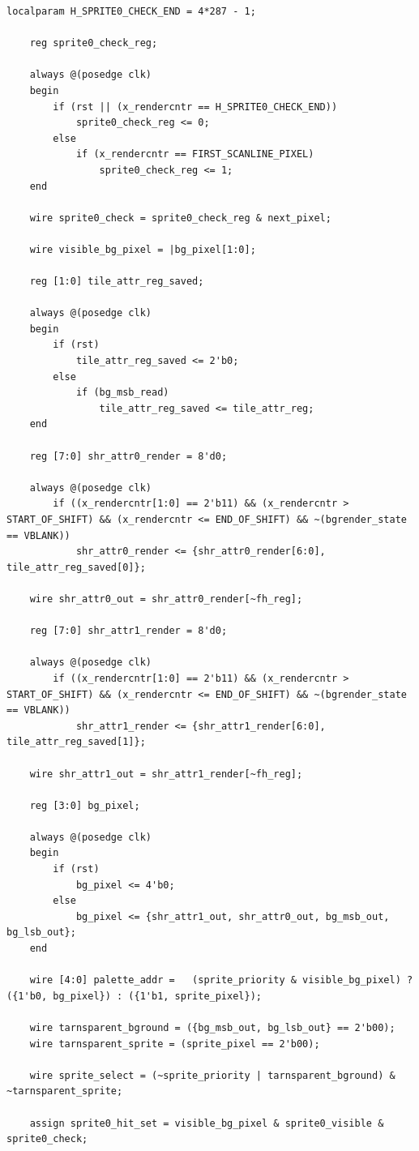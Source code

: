 	\begin{lstlisting}[style=prettyverilog]
	localparam H_SPRITE0_CHECK_END = 4*287 - 1;
	
	reg sprite0_check_reg;
	
	always @(posedge clk)
	begin
		if (rst || (x_rendercntr == H_SPRITE0_CHECK_END))
			sprite0_check_reg <= 0;
		else
			if (x_rendercntr == FIRST_SCANLINE_PIXEL)
				sprite0_check_reg <= 1;
	end
	
	wire sprite0_check = sprite0_check_reg & next_pixel;
	
	wire visible_bg_pixel = |bg_pixel[1:0];
	
	reg [1:0] tile_attr_reg_saved;
	
	always @(posedge clk) 
	begin
		if (rst)
			tile_attr_reg_saved <= 2'b0;
		else
			if (bg_msb_read)
				tile_attr_reg_saved <= tile_attr_reg;
	end
	
	reg [7:0] shr_attr0_render = 8'd0; 
	
	always @(posedge clk) 
		if ((x_rendercntr[1:0] == 2'b11) && (x_rendercntr > START_OF_SHIFT) && (x_rendercntr <= END_OF_SHIFT) && ~(bgrender_state == VBLANK))
			shr_attr0_render <= {shr_attr0_render[6:0], tile_attr_reg_saved[0]};
	
	wire shr_attr0_out = shr_attr0_render[~fh_reg];
	
	reg [7:0] shr_attr1_render = 8'd0; 
	
	always @(posedge clk) 
		if ((x_rendercntr[1:0] == 2'b11) && (x_rendercntr > START_OF_SHIFT) && (x_rendercntr <= END_OF_SHIFT) && ~(bgrender_state == VBLANK))
			shr_attr1_render <= {shr_attr1_render[6:0], tile_attr_reg_saved[1]};
	
	wire shr_attr1_out = shr_attr1_render[~fh_reg];
	
	reg [3:0] bg_pixel;
	
	always @(posedge clk) 
	begin
		if (rst)
			bg_pixel <= 4'b0;
		else
			bg_pixel <= {shr_attr1_out, shr_attr0_out, bg_msb_out, bg_lsb_out};		
	end
	
	wire [4:0] palette_addr = 	(sprite_priority & visible_bg_pixel) ? ({1'b0, bg_pixel}) : ({1'b1, sprite_pixel});
		
	wire tarnsparent_bground = ({bg_msb_out, bg_lsb_out} == 2'b00);
	wire tarnsparent_sprite = (sprite_pixel == 2'b00);
	
	wire sprite_select = (~sprite_priority | tarnsparent_bground) & ~tarnsparent_sprite;

	assign sprite0_hit_set = visible_bg_pixel & sprite0_visible & sprite0_check;\end{lstlisting}

